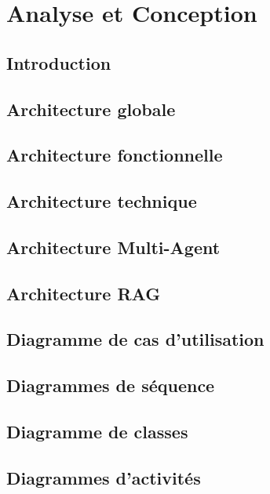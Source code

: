 \documentclass[12pt,a4paper,oneside]{report}
\begin{document}

\chapter{Analyse et Conception}

\section{Introduction}

\section{Architecture globale}

\section{Architecture fonctionnelle}

\section{Architecture technique}

\section{Architecture Multi-Agent}

\section{Architecture RAG}

\section{Diagramme de cas d'utilisation}

\section{Diagrammes de séquence}

\section{Diagramme de classes}

\section{Diagrammes d'activités}
\end{document}
